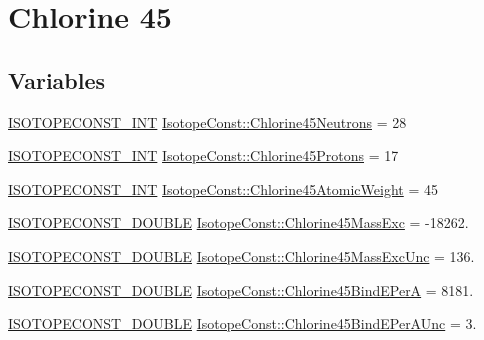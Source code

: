\hypertarget{group___isotope_const-_chlorine-_cl45}{}\section{Chlorine 45}
\label{group___isotope_const-_chlorine-_cl45}
\subsection*{Variables}
\begin{DoxyCompactItemize}
\item 
\mbox{\hyperlink{group___isotope_const-_macros_ga5f18360b3e99483a35c32d789e62621c}{I\+S\+O\+T\+O\+P\+E\+C\+O\+N\+S\+T\+\_\+\+I\+NT}} \mbox{\hyperlink{group___isotope_const-_chlorine-_cl45_ga9233c54a09a5c8be8f9c5c1a2e552da4}{Isotope\+Const\+::\+Chlorine45\+Neutrons}} = 28
\item 
\mbox{\hyperlink{group___isotope_const-_macros_ga5f18360b3e99483a35c32d789e62621c}{I\+S\+O\+T\+O\+P\+E\+C\+O\+N\+S\+T\+\_\+\+I\+NT}} \mbox{\hyperlink{group___isotope_const-_chlorine-_cl45_ga7e7210564c1404ae3fba0f07f981db4f}{Isotope\+Const\+::\+Chlorine45\+Protons}} = 17
\item 
\mbox{\hyperlink{group___isotope_const-_macros_ga5f18360b3e99483a35c32d789e62621c}{I\+S\+O\+T\+O\+P\+E\+C\+O\+N\+S\+T\+\_\+\+I\+NT}} \mbox{\hyperlink{group___isotope_const-_chlorine-_cl45_gad8c7255a219897f793c7f5173af91d8c}{Isotope\+Const\+::\+Chlorine45\+Atomic\+Weight}} = 45
\item 
\mbox{\hyperlink{group___isotope_const-_macros_ga8f45a7272ce02c0b4c65c44636ed719a}{I\+S\+O\+T\+O\+P\+E\+C\+O\+N\+S\+T\+\_\+\+D\+O\+U\+B\+LE}} \mbox{\hyperlink{group___isotope_const-_chlorine-_cl45_ga54a435c8b1ac40d7813046d1e3797733}{Isotope\+Const\+::\+Chlorine45\+Mass\+Exc}} = -\/18262.
\item 
\mbox{\hyperlink{group___isotope_const-_macros_ga8f45a7272ce02c0b4c65c44636ed719a}{I\+S\+O\+T\+O\+P\+E\+C\+O\+N\+S\+T\+\_\+\+D\+O\+U\+B\+LE}} \mbox{\hyperlink{group___isotope_const-_chlorine-_cl45_gaa41a4dac63f6ad35bb37454a5974aff9}{Isotope\+Const\+::\+Chlorine45\+Mass\+Exc\+Unc}} = 136.
\item 
\mbox{\hyperlink{group___isotope_const-_macros_ga8f45a7272ce02c0b4c65c44636ed719a}{I\+S\+O\+T\+O\+P\+E\+C\+O\+N\+S\+T\+\_\+\+D\+O\+U\+B\+LE}} \mbox{\hyperlink{group___isotope_const-_chlorine-_cl45_ga183d4d32e0e580221024efd0f85fad0b}{Isotope\+Const\+::\+Chlorine45\+Bind\+E\+PerA}} = 8181.
\item 
\mbox{\hyperlink{group___isotope_const-_macros_ga8f45a7272ce02c0b4c65c44636ed719a}{I\+S\+O\+T\+O\+P\+E\+C\+O\+N\+S\+T\+\_\+\+D\+O\+U\+B\+LE}} \mbox{\hyperlink{group___isotope_const-_chlorine-_cl45_ga8e610c13ecfb9821f3c046aa076f1e09}{Isotope\+Const\+::\+Chlorine45\+Bind\+E\+Per\+A\+Unc}} = 3.

\end{DoxyCompactItemize}
